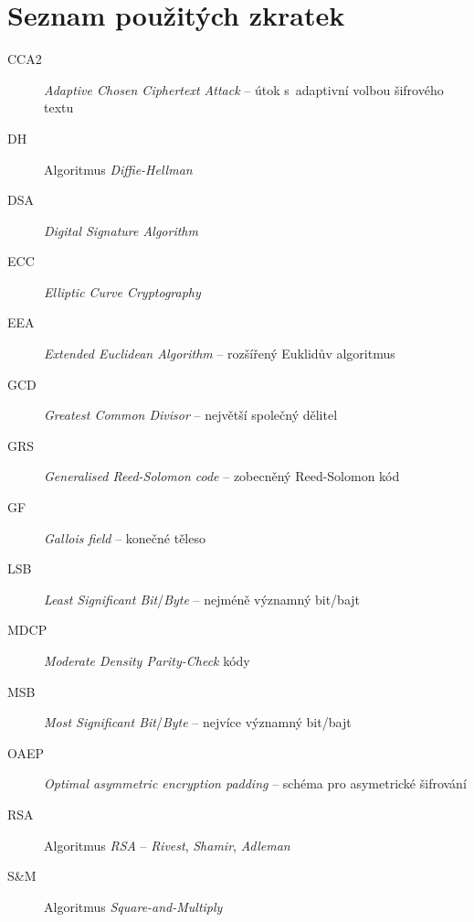 \documentclass[thesis=M,czech,hidelinks]{FITthesis}[2012/06/26]
\newcommand{\0}{{\textcolor[gray]{0.75}{0}}}
\begin{document}
\chapter{Seznam použitých zkratek}
\begin{description}
        \item[CCA2] \emph{Adaptive Chosen Ciphertext Attack} -- útok s~adaptivní volbou šifrového textu
        \item[DH]   Algoritmus \emph{Diffie-Hellman}
        \item[DSA]  \emph{Digital Signature Algorithm}
        \item[ECC]  \emph{Elliptic Curve Cryptography}
        \item[EEA]  \emph{Extended Euclidean Algorithm} -- rozšířený Euklidův algoritmus
        \item[GCD]  \emph{Greatest Common Divisor} -- největší společný dělitel
        \item[GRS]  \emph{Generalised Reed-Solomon code} -- zobecněný Reed-Solomon kód
        \item[GF]   \emph{Gallois field} -- konečné těleso
        \item[LSB]  \emph{Least Significant Bit}/\emph{Byte} -- nejméně významný bit/bajt
        \item[MDCP] \emph{Moderate Density Parity-Check} kódy
        \item[MSB]  \emph{Most Significant Bit}/\emph{Byte} -- nejvíce významný bit/bajt
        \item[OAEP] \emph{Optimal asymmetric encryption padding} -- schéma pro asymetrické šifrování
        \item[RSA]  Algoritmus \emph{RSA} -- \emph{Rivest}, \emph{Shamir}, \emph{Adleman}
        \item[S\&M] Algoritmus \emph{Square-and-Multiply}
\end{description}


\end{document}

